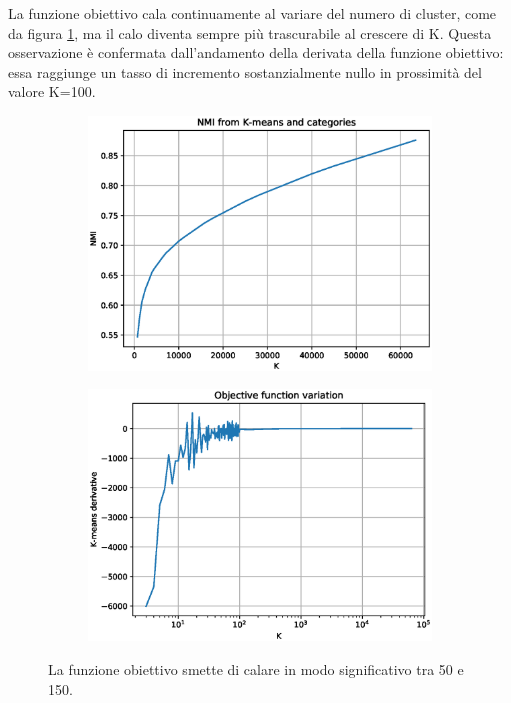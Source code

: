 \documentclass[
	11pt, %
	a4paper, %
	oneside, %
	headinclude,footinclude, %
	BCOR5mm, %
]{scrartcl}
\begin{document}
		La funzione obiettivo cala continuamente al variare del numero di cluster, come da figura \ref{fig:KMeansObj}, ma il calo diventa sempre più trascurabile al crescere di K.
		Questa osservazione è confermata dall'andamento della derivata della funzione obiettivo: essa raggiunge un tasso di incremento sostanzialmente nullo in prossimità del valore K=100.

		\begin{figure}[!htb]
			\hspace{-1cm}
			\begin{subfigure}{.5\textwidth}
				\centering
				\includegraphics[scale=.5]{../results/NMI-kmeans-categories.eps}
			\end{subfigure}
			\hspace{0.5cm}
			\begin{subfigure}{.5\textwidth}
				\centering
				\includegraphics[scale=.5]{../results/KMeansDerivative.eps}
			\end{subfigure}
			\caption{La funzione obiettivo smette di calare in modo significativo tra 50 e 150.}
			\label{fig:KMeansObj}
		\end{figure}
\end{document}
